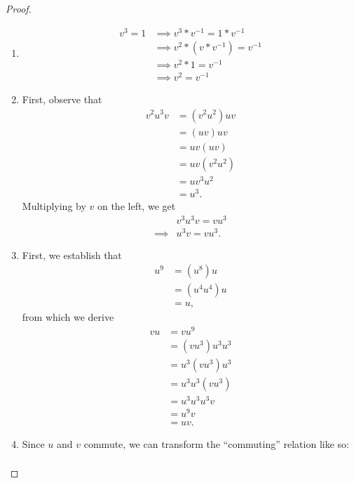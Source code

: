 \documentclass[12pt]{article}
\theoremstyle{definition}
\begin{document}
\begin{proof}
	\begin{enumerate}[label=(\alph*)]
		\item \begin{align*}
			      v^3 = 1 & \implies v^3 * v^{-1} = 1 * v^{-1}   \\
			              & \implies v^2 * (v * v^{-1}) = v^{-1} \\
			              & \implies v^2 * 1 = v^{-1}            \\
			              & \implies v^2 = v^{-1}
		      \end{align*}
		\item First, observe that \begin{align*}
			      v^2u^3v & = (v^2u^2)uv \\
			              & = (uv)uv     \\
			              & = uv(uv)     \\
			              & = uv(v^2u^2) \\
			              & = uv^3u^2    \\
			              & = u^3.
		      \end{align*}
		      Multiplying by $v$ on the left, we get \begin{align*}
			               & v^3u^3v  = vu^3 \\
			      \implies & u^3v = vu^3.
		      \end{align*}
		\item First, we establish that \begin{align*}
			      u^9 & = (u^8)u    \\
			          & = (u^4u^4)u \\
			          & = u,
		      \end{align*}
		      from which we derive \begin{align*}
			      vu & = vu^9         \\
			         & = (vu^3)u^3u^3 \\
			         & = u^3(vu^3)u^3 \\
			         & = u^3u^3(vu^3) \\
			         & = u^3u^3u^3v   \\
			         & = u^9v         \\
			         & = uv.
		      \end{align*}
		\item Since $u$ and $v$ commute, we can transform the ``commuting'' relation like so: \begin{align*}

\end{align*}
\end{enumerate}
\end{proof}
\end{document}
